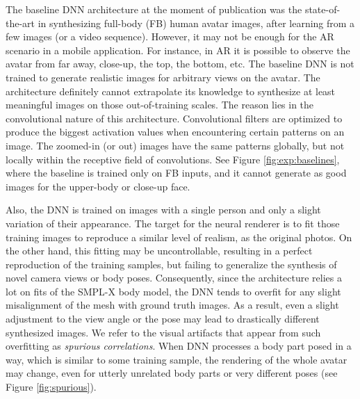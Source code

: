 
The baseline DNN architecture \cite{dnn:stylepeople21} at the moment of publication was the state-of-the-art in synthesizing full-body (FB) human avatar images, after learning from a few images (or a video sequence). However, it may not be enough for the AR scenario in a mobile application. For instance, in AR it is possible to observe the avatar from far away, close-up, the top, the bottom, etc. The baseline DNN is not trained to generate realistic images for arbitrary views on the avatar. The architecture definitely cannot extrapolate its knowledge to synthesize at least meaningful images on those out-of-training scales. The reason lies in the convolutional nature of this architecture. Convolutional filters are optimized to produce the biggest activation values when encountering certain patterns on an image. The zoomed-in (or out) images have the same patterns globally, but not locally within the receptive field of convolutions. See Figure \ref{fig:exp:baselines}, where the baseline is trained only on FB inputs, and it cannot generate as good images for the upper-body or close-up face.

Also, the DNN is trained on images with a single person and only a slight variation of their appearance. The target for the neural renderer is to fit those training images to reproduce a similar level of realism, as the original photos. On the other hand, this fitting may be uncontrollable, resulting in a perfect reproduction of the training samples, but failing to generalize the synthesis of novel camera views or body poses. Consequently, since the architecture relies a lot on fits of the SMPL-X body model, the DNN tends to overfit for any slight misalignment of the mesh with ground truth images. As a result, even a slight adjustment to the view angle or the pose may lead to drastically different synthesized images. We refer to the visual artifacts that appear from such overfitting as \textit{spurious correlations}. When DNN processes a body part posed in a way, which is similar to some training sample, the rendering of the whole avatar may change, even for utterly unrelated body parts or very different poses (see Figure \ref{fig:spurious}).

